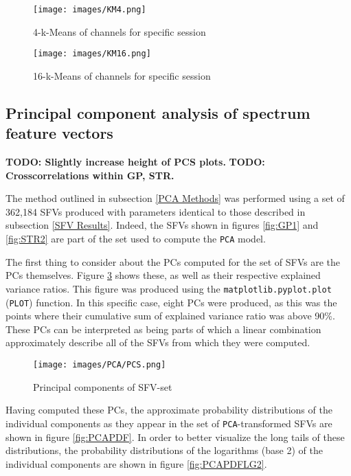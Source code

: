 \documentclass{article}
\begin{document}
\begin{figure}[H]
    \centering
    \centerline{\texttt{[image: images/KM4.png]}}
    \caption{4-k-Means of channels for specific session}
    \label{fig:KM4}
\end{figure}

\begin{figure}[H]
    \centering
    \centerline{\texttt{[image: images/KM16.png]}}
    \caption{16-k-Means of channels for specific session}
    \label{fig:KM16}
\end{figure}

\subsection{Principal component analysis of spectrum feature vectors}

\textbf{TODO: Slightly increase height of PCS plots.}
\textbf{TODO: Crosscorrelations within GP, STR.}

The method outlined in subsection \ref{PCA Methods} was performed using a set of 362,184 SFVs produced with parameters identical to those described in subsection \ref{SFV Results}.
Indeed, the SFVs shown in figures \ref{fig:GP1} and \ref{fig:STR2} are part of the set used to compute the \texttt{PCA} model.

The first thing to consider about the PCs computed for the set of SFVs are the PCs themselves.
Figure \ref{fig:PCS} shows these, as well as their respective explained variance ratios. 
This figure was produced using the \texttt{matplotlib.pyplot.plot} (\texttt{PLOT}) function.
In this specific case, eight PCs were produced, as this was the points where their cumulative sum of explained variance ratio was above 90\%.
These PCs can be interpreted as being parts of which a linear combination approximately describe all of the SFVs from which they were computed.

\begin{figure}[H]
    \centering
    \centerline{\texttt{[image: images/PCA/PCS.png]}}
    \caption{Principal components of SFV-set}
    \label{fig:PCS}
\end{figure}

Having computed these PCs, the approximate probability distributions of the individual components as they appear in the set of \texttt{PCA}-transformed SFVs are shown in figure \ref{fig:PCAPDF}. 
In order to better visualize the long tails of these distributions, the probability distributions of the logarithms (base 2) of the individual components are shown in figure \ref{fig:PCAPDFLG2}.
\end{document}
